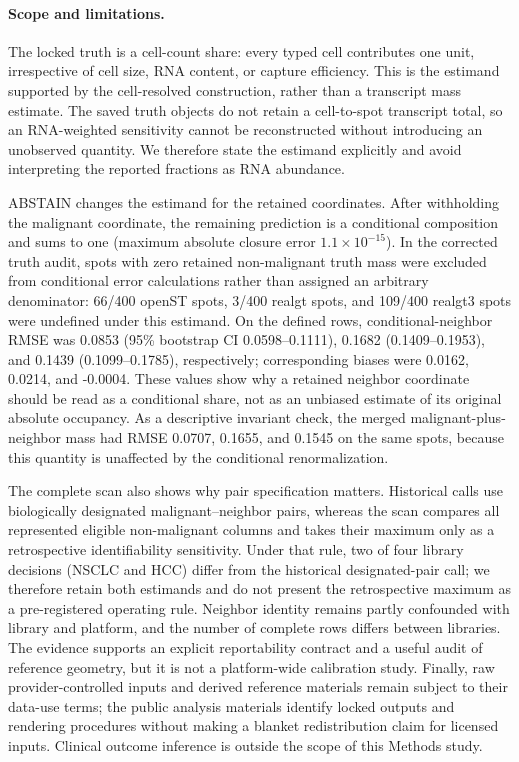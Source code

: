 \paragraph{Scope and limitations.}
The locked truth is a cell-count share: every typed cell contributes one unit,
irrespective of cell size, RNA content, or capture efficiency.  This is the
estimand supported by the cell-resolved construction, rather than a transcript
mass estimate.  The saved truth objects do not retain a cell-to-spot transcript
total, so an RNA-weighted sensitivity cannot be reconstructed without introducing
an unobserved quantity.  We therefore state the estimand explicitly and avoid
interpreting the reported fractions as RNA abundance.

ABSTAIN changes the estimand for the retained coordinates.  After withholding
the malignant coordinate, the remaining prediction is a conditional composition
and sums to one (maximum absolute closure error $1.1\times10^{-15}$).  In the
corrected truth audit, spots with zero retained non-malignant truth mass were
excluded from conditional error calculations rather than assigned an arbitrary
denominator: 66/400 openST spots, 3/400 realgt spots, and 109/400 realgt3 spots
were undefined under this estimand.  On the defined rows, conditional-neighbor
RMSE was 0.0853 (95\% bootstrap CI 0.0598--0.1111), 0.1682 (0.1409--0.1953),
and 0.1439 (0.1099--0.1785), respectively; corresponding biases were 0.0162,
0.0214, and -0.0004.  These values show why a retained neighbor coordinate
should be read as a conditional share, not as an unbiased estimate of its
original absolute occupancy.  As a descriptive invariant check, the merged
malignant-plus-neighbor mass had RMSE 0.0707, 0.1655, and 0.1545 on the same
spots, because this quantity is unaffected by the conditional renormalization.

The complete scan also shows why pair specification matters.  Historical calls
use biologically designated malignant--neighbor pairs, whereas the scan compares
all represented eligible non-malignant columns and takes their maximum only as a
retrospective identifiability sensitivity.  Under that rule, two of four library
decisions (NSCLC and HCC) differ from the historical designated-pair call; we
therefore retain both estimands and do not present the retrospective maximum as a
pre-registered operating rule.  Neighbor identity remains partly confounded with
library and platform, and the number of complete rows differs between libraries.
The evidence supports an explicit reportability contract and a useful audit of
reference geometry, but it is not a platform-wide calibration study.  Finally,
raw provider-controlled inputs and derived reference materials remain subject to
their data-use terms; the public analysis materials identify locked outputs and
rendering procedures without making a blanket redistribution claim for licensed
inputs.  Clinical outcome inference is outside the scope of this Methods study.
